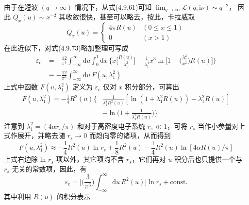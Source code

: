 由于在短波 $(q\to\infty)$ 情况下，从式(4.9.61)可知
$\displaystyle\lim_{q\to\infty}\mathcal{L}(q,\mathrm{i}\nu)\sim q^{-2}$，
因此 $Q_{x}(u)\sim x^{-2}$ 其收敛很快，甚至可以略去，按此，卡拉威取
\begin{equation}
  Q_{x}(u)=\left\{\begin{array}{ll}
  4\pi R(u) & \left(0\leqslant x\leqslant 1\right)\\
  0 & \left(x>1\right)
  \end{array}\right.
\end{equation}
在此近似下，对式(4.9.73)略加整理可写成
\begin{equation}
\begin{aligned}
  \varepsilon_{\mathrm{c}}
  &=-\frac{12}{\pi^{3}}\int_{-\infty}^{\infty}\mathrm{d}u
  \int_{0}^{1}\mathrm{d}x\,
  \bigg\{x\bigg[\frac{R(u)}{\lambda_{1}^{2}}\bigg]
  -\frac{1}{\lambda_{1}^{4}}x^{3}
  \ln\bigg[1+\bigg(\frac{\lambda_{1}^{2}}{x^{2}}\bigg)R(u)\bigg]\bigg\}\\
  &\equiv-\frac{12}{\pi^{3}}\int_{-\infty}^{\infty}\mathrm{d}u\,
  F(u,\lambda_{1}^{2})
\end{aligned}
\end{equation}
上式中函数 $F(u,\lambda_{1}^{2})$ 定义为 $\varepsilon_{\mathrm{c}}$ 仅对 $x$ 积分部分，可算出
\begin{equation}
\begin{aligned}
  F(u,\lambda_{1}^{2})
  =-\frac{1}{4}R^{2}(u)\bigg\{
  &\frac{1}{\lambda_{1}^{4}R^{2}(u)}
  \left[\ln\left(1+\lambda_{1}^{2}R(u)\right)-\lambda_{1}^{2}R(u)\right]\\
  &-\ln\bigg(1+\frac{1}{\lambda_{1}^{2}R(u)}\bigg)\bigg\}
\end{aligned}
\end{equation}
注意到 $\lambda_{1}^{2}=\left(4\alpha r_{s}/\pi\right)$ 和对于高密度电子系统 $r_{s}\ll 1$，可将 $r_{s}$ 当作小参量对上式作展开，并略去随 $r_{s}\to 0$ 而趋向零的诸项，从而得到
\begin{equation}
  F(u,\lambda_{1}^{2})\approx-\frac{1}{4}R^{2}(u)\ln r_{s}
  +\frac{1}{8}R^{2}(u)-\frac{1}{4}R^{2}(u)\ln\left[4\alpha R(u)/\pi\right]
\end{equation}
上式右边除 ln $r_{s}$ 项以外，其它项均不含 $r_{s}$，它们再对 $u$ 积分后也只提供一个与 $r_{s}$ 无关的常数项，因此，有
\begin{equation}
  \varepsilon_{\mathrm{c}}=\bigg[\bigg(\frac{3}{\pi^{3}}\bigg)
  \int_{-\infty}^{\infty}\mathrm{d}u\,R^{2}(u)\bigg]\ln r_{s}+\mathrm{const.}
\end{equation}
其中利用 $R(u)$ 的积分表示
